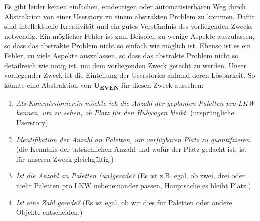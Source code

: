 Es gibt leider keinen einfachen, eindeutigen oder automatisierbaren Weg
durch Abstraktion von einer Userstory zu einem abstrakten Problem zu kommen.
Dafür sind intellektuelle Kreativität
und ein gutes Verständnis des vorliegenden Zwecks notwendig.
Ein möglicher Fehler ist zum Beispiel,
zu wenige Aspekte auszulassen,
so dass das abstrakte Problem nicht so einfach wie möglich ist.
Ebenso ist es ein Fehler, zu viele Aspekte auszulassen,
so dass das abstrakte Problem nicht so detailreich wie nötig ist,
um dem vorliegenden Zweck gerecht zu werden.
Unser vorliegender Zweck ist die Einteilung der Userstories anhand deren Lösbarkeit.
So könnte eine Abstraktion von \textbf{U\textsubscript{EVEN}} für diesen Zweck aussehen:
\begin{enumerate}
    \item \emph{Als Kommissionier:in
         möchte ich die Anzahl der geplanten Paletten pro LKW kennen,
         um zu sehen, ob Platz für den Hubwagen bleibt.
        } (ursprüngliche Userstory).
    \item \emph{Identifikation der Anzahl an Paletten, um verfügbaren Platz zu quantifzieren.}
        (die Kenntnis der tatsächlichen Anzahl und wofür der Platz gedacht ist,
        ist für unseren Zweck gleichgültig.)
    \item \emph{Ist die Anzahl an Paletten (un)gerade?}
        (Es ist z.B. egal,
        ob zwei, drei oder mehr Paletten pro LKW nebeneinander passen,
        Hauptsache es bleibt Platz.)
    \item \emph{Ist eine Zahl gerade?}
        (Es ist egal, ob wir dies für Paletten oder andere Objekte entscheiden.)
\end{enumerate}


